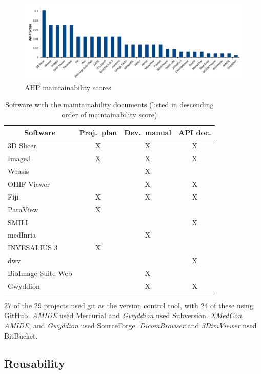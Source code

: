 \documentclass[final, 3p, times, authoryear]{elsarticle}
\begin{document}
\begin{figure}[!ht]
\includegraphics[scale=0.48]{figures/maintainability_scores.pdf}
\caption{AHP maintainability scores}
\label{fg_maintainability_scores}
\end{figure}

\begin{table}[!ht]
\centering
\begin{tabular}{lccc}
\toprule
\multicolumn{1}{c}{Software} & Proj.\ plan & Dev.\ manual & API doc. \\ 
\midrule
3D Slicer & X & X & X \\
ImageJ & X & X & X \\
Weasis &  & X &  \\
OHIF Viewer &  & X & X \\
Fiji & X & X & X \\
ParaView & X &  &  \\
SMILI &  &  & X \\
medInria &  & X &  \\
INVESALIUS 3 & X &  &  \\
dwv &  &  & X \\
BioImage Suite Web &  & X &  \\
Gwyddion &  & X & X \\ 
\bottomrule
\end{tabular}
\caption{Software with the maintainability documents (listed in descending order of 
maintainability score)}
\label{tab_maintainability_docs}
\end{table}

27 of the 29 projects used git as the version control tool, with 24 of these
using GitHub. \textit{AMIDE} used Mercurial and \textit{Gwyddion} used
Subversion. \textit{XMedCon}, \textit{AMIDE}, and \textit{Gwyddion} used
SourceForge. \textit{DicomBrowser} and \textit{3DimViewer} used BitBucket. 

\subsection{Reusability} \label{sec_result_reusability}
\end{document}
